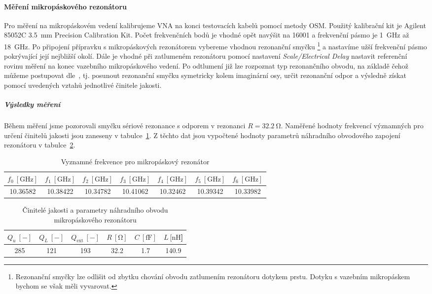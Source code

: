 \documentclass[11pt,a4paper]{article}
\newcommand{\Ohm}{\mathrm{\Omega}}
\newcommand{\GHz}{\mathrm{GHz}}
\begin{document}
\paragraph*{Měření mikropáskového rezonátoru} Pro měření na mikropáskovém vedení kalibrujeme VNA na konci testovacích kabelů pomocí metody OSM. Použitý kalibrační kit je Agilent 85052C 3.5~mm Precision Calibration Kit. Počet frekvenčních bodů je vhodné opět navýšit na 16001 a frekvenční pásmo je 1~GHz až 18~GHz. Po připojení přípravku s mikropáskových rezonátorem vybereme vhodnou rezonanční smyčku%
    \footnote{Rezonanční smyčky lze odlišit od zbytku chování obvodu zatlumením rezonátoru dotykem prstu. Dotyku s vazebním mikropáskem bychom se však měli vyvarovat.}
a nastavíme užší frekvenční pásmo pokrývající její nejbližší okolí. Dále je vhodné při zatlumeném rezonátoru pomocí nastavení \emph{Scale/Electrical Delay} nastavit referenční rovinu měření na konec vazebního mikropáskového vedení. Po odtlumení již lze rozpoznat typ rezonančního obvodu, na základě čehož můžeme postupovat dle~\cite{tysl:mereni-pri-velmi-vysokych-kmitoctech}, tj. posunout rezonanční smyčku symetricky kolem imaginární osy, určit rezonanční odpor a výsledně získat pomocí uvedených vztahů jednotlivé činitele jakosti.

\subparagraph*{Výsledky měření} Během měření jsme pozorovali smyčku sériové rezonance s odporem v rezonanci $R = 32.2\ \Ohm$. Naměřené hodnoty frekvencí významných pro určení činitelů jakosti jsou zaneseny v tabulce~\ref{table:mikropaskovy-rezonator-frekvence}. Z těchto dat jsou vypočtené hodnoty parametrů náhradního obvodového zapojení rezonátoru v tabulce~\ref{table:mikropaskovy-rezonator-hodnoty}.
\begin{table}[!ht]
\centering
\begin{tabular}{|c|c|c|c|c|c|c|}
    \hline
    $f_0\ [\GHz]$ & $f_1\ [\GHz]$ & $f_2\ [\GHz]$ & $f_3\ [\GHz]$ & $f_4\ [\GHz]$ & $f_5\ [\GHz]$ & $f_6\ [\GHz]$\\
    \hline\hline
    10.36582 & 10.38422 & 10.34782 & 10.41062 & 10.32462 & 10.39342 & 10.33982\\
    \hline
\end{tabular}
\caption{\label{table:mikropaskovy-rezonator-frekvence}Vyznamné frekvence pro mikropáskový rezonátor}
\end{table}
\begin{table}[!ht]
\centering
\begin{tabular}{|c|c|c|c|c|c|}
    \hline
    $Q_u\ [-]$ & $Q_L\ [-]$ & $Q_{\mathrm{ext}}\ [-]$ & $R\ [\mathrm{\Omega}]$ & $C\ [\mathrm{fF}]$ & $L\ [\mathrm{nH}$]\\
    \hline\hline
    285 & 121 & 193 & 32.2 & 1.7 & 140.9\\
    \hline
\end{tabular}
\caption{\label{table:mikropaskovy-rezonator-hodnoty}Činitelé jakosti a parametry náhradního obvodu mikropáskového rezonátoru}
\end{table}
\end{document}
